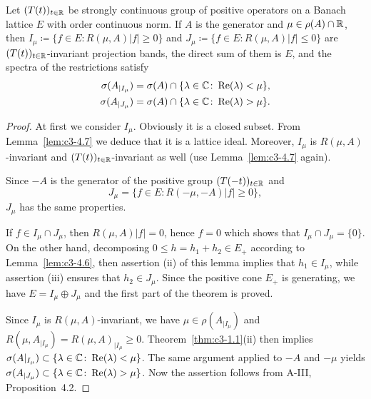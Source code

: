 \begin{theorem} \label{thm:c3-4.8}
Let $(T(t))_{t \in \mathbb{R} }$ be strongly continuous group of positive
operators on a Banach lattice $E$ with order continuous norm.
If $A$ is the generator and $\mu \in \rho(A) \cap \mathbb{R} $, then
$I_{\mu} \coloneqq  \{f \in E \colon R(\mu,A)|f| \geq 0\}$ and $J_{\mu} \coloneqq  \{f \in E \colon R(\mu,A)|f| \leq 0\}$
are $(T(t))_{t \in \mathbb{R} }$-invariant projection bands, 
the direct sum of them is $E$, and the spectra of the restrictions satisfy
\begin{align*}
	\sigma(A_{|I_{\mu}}) &= \sigma(A) \cap \{\lambda \in \mathbb{C}  \colon \mathop{}\!\mathrm{Re}(\lambda) < \mu\} ,\\
	\sigma(A_{|J_{\mu}}) &= \sigma(A) \cap \{\lambda \in \mathbb{C}  \colon \mathop{}\!\mathrm{Re}(\lambda) > \mu\} .
\end{align*}
\end{theorem}
\begin{proof}
At first we consider $I_{\mu}$. Obviously it is a closed subset.
From Lemma~\ref{lem:c3-4.7} we deduce that it is a lattice ideal. Moreover, $I_{\mu}$
is $R(\mu,A)$-invariant and $(T(t))_{t \in \mathbb{R} }$-invariant as well (use Lemma~\ref{lem:c3-4.7}
again).

Since $-A$ is the generator of the positive group $(T(-t))_{t \in \mathbb{R} }$ and
%
\[
	 J_{\mu} = \{f \in E \colon R(-\mu,-A)|f| \geq 0\} ,
\]
%
$J_{\mu}$ has the same properties.

If $f \in I_{\mu} \cap J_{\mu}$, then $R(\mu,A)|f| = 0$, hence $f = 0$ which shows that
$I_{\mu} \cap J_{\mu} = \{0\}$. On the other hand, decomposing $0 \leq h = h_1 + h_2 \in E_+$
according to Lemma~\ref{lem:c3-4.6}, then assertion (ii) of this lemma implies
that $h_1 \in I_{\mu}$, while assertion (iii) ensures that $h_2 \in J_{\mu}$. Since the
positive cone $E_+$ is generating, we have $E = I_{\mu} \oplus J_{\mu}$ and the first part
of the theorem is proved.

Since $I_{\mu}$ is $R(\mu,A)$-invariant, we have $\mu \in \rho(A_{|I_{\mu}})$ and
$R(\mu,A_{|I_{\mu}}) = R(\mu,A)_{|I_{\mu}} \geq 0$. Theorem~\ref{thm:c3-1.1}(ii) then implies
$\sigma(A|_{I_{\mu}}) \subset \{\lambda \in \mathbb{C}  \colon \mathop{}\!\mathrm{Re}(\lambda) < \mu\}$. The same argument applied to $-A$ and
$-\mu$ yields $\sigma(A_{|J_{\mu}}) \subset \{\lambda \in \mathbb{C}  \colon \mathop{}\!\mathrm{Re}(\lambda) > \mu\}$. Now the assertion follows
from A-III, Proposition~4.2.
\end{proof}

